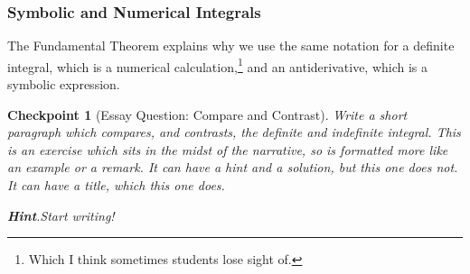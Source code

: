 \documentclass[pdflatex]{sn-jnl}
\theoremstyle{thmstyleone}%
\theoremstyle{thmstyletwo}%
\newtheorem{inlineexercise}[theorem]{Checkpoint}
\theoremstyle{thmstylethree}%
\newcommand{\blocktitlefont}{\relax}
\numberwithin{equation}{section}
\begin{document}
\subsubsection{Symbolic and Numerical Integrals}\label{subsubsection-different-integrals}%
The Fundamental Theorem explains why we use the same notation for a definite integral, which is a numerical calculation,\footnote{Which I think sometimes students lose sight of.\label{subsubsection-different-integrals-2-1}} and an antiderivative, which is a symbolic expression.%
\begin{inlineexercise}[Essay Question: Compare and Contrast]\label{exercise-essay}%
%
Write a short paragraph which compares, and contrasts, the definite and indefinite integral. This is an exercise which sits in the midst of the narrative, so is formatted more like an example or a remark.  It can have a hint and a solution, but this one does not.  It can have a title, which this one does.%
\par\smallskip%
\noindent\textbf{\blocktitlefont Hint}.\hypertarget{exercise-essay-3}{}\quad{}Start writing!%
\end{inlineexercise}%
%
%
\typeout{************************************************}
\typeout{************************************************}
%
\end{document}
